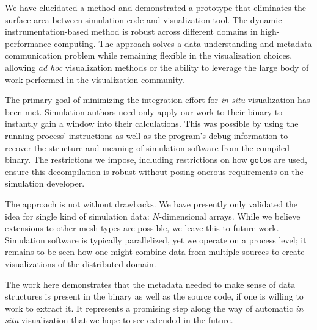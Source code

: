 
We have elucidated a method and demonstrated a prototype that
eliminates the surface area between simulation code and visualization
tool.  The dynamic instrumentation-based method is robust across
different domains in high-performance computing.  The approach solves a
data understanding and metadata communication problem while remaining
flexible in the visualization choices, allowing \textit{ad hoc}
visualization methods or the ability to leverage the large body of work
performed in the visualization community.

The primary goal of minimizing the integration effort for \textit{in
situ} visualization has been met.  Simulation authors need only
apply our work to their binary to instantly gain a window into their
calculations.  This was possible by using the running process'
instructions as well as the program's debug information to recover the
structure and meaning of simulation software from the compiled binary.
The restrictions we impose, including restrictions on how
\texttt{goto}s are used, ensure this decompilation is robust without
posing onerous requirements on the simulation developer.


The approach is not without drawbacks.  We have presently only
validated the idea for single kind of simulation data: $N$-dimensional
arrays.  While we believe extensions to other mesh types are possible,
we leave this to future work.  Simulation software is typically
parallelized, yet we operate on a process level; it remains to be
seen how one might combine data from multiple sources to create
visualizations of the distributed domain.

The work here demonstrates that the metadata needed to make sense of
data structures is present in the binary as well as the source code, if
one is willing to work to extract it.  It represents a promising step
along the way of automatic \textit{in situ} visualization that we hope
to see extended in the future.

